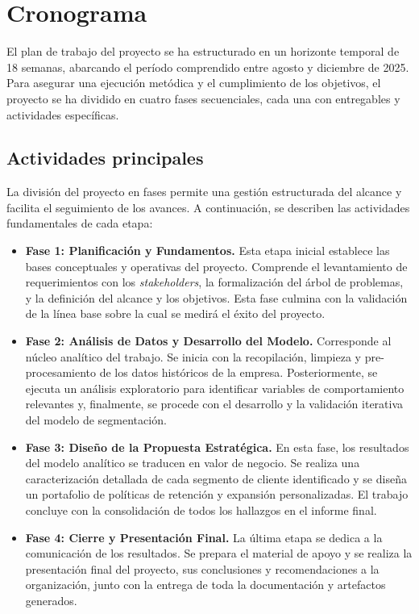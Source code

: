 \section{Cronograma}
El plan de trabajo del proyecto se ha estructurado en un horizonte temporal de 18 semanas, abarcando el período comprendido entre agosto y diciembre de 2025. Para asegurar una ejecución metódica y el cumplimiento de los objetivos, el proyecto se ha dividido en cuatro fases secuenciales, cada una con entregables y actividades específicas.

\subsection{Actividades principales} %
La división del proyecto en fases permite una gestión estructurada del alcance y facilita el seguimiento de los avances. A continuación, se describen las actividades fundamentales de cada etapa:

\begin{itemize}
    \item \textbf{Fase 1: Planificación y Fundamentos.} Esta etapa inicial establece las bases conceptuales y operativas del proyecto. Comprende el levantamiento de requerimientos con los \textit{stakeholders}, la formalización del árbol de problemas, y la definición del alcance y los objetivos. Esta fase culmina con la validación de la línea base sobre la cual se medirá el éxito del proyecto.

    \item \textbf{Fase 2: Análisis de Datos y Desarrollo del Modelo.} Corresponde al núcleo analítico del trabajo. Se inicia con la recopilación, limpieza y pre-procesamiento de los datos históricos de la empresa. Posteriormente, se ejecuta un análisis exploratorio para identificar variables de comportamiento relevantes y, finalmente, se procede con el desarrollo y la validación iterativa del modelo de segmentación.

    \item \textbf{Fase 3: Diseño de la Propuesta Estratégica.} En esta fase, los resultados del modelo analítico se traducen en valor de negocio. Se realiza una caracterización detallada de cada segmento de cliente identificado y se diseña un portafolio de políticas de retención y expansión personalizadas. El trabajo concluye con la consolidación de todos los hallazgos en el informe final.

    \item \textbf{Fase 4: Cierre y Presentación Final.} La última etapa se dedica a la comunicación de los resultados. Se prepara el material de apoyo y se realiza la presentación final del proyecto, sus conclusiones y recomendaciones a la organización, junto con la entrega de toda la documentación y artefactos generados.
\end{itemize}

